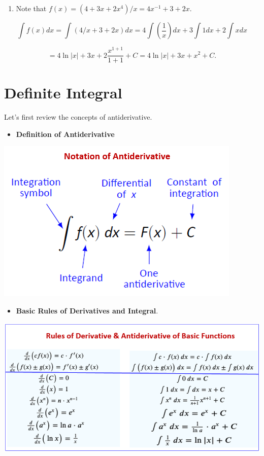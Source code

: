 \documentclass[
]{book}
\providecommand{\tightlist}{%
  \setlength{\itemsep}{0pt}\setlength{\parskip}{0pt}}
\begin{document}
\begin{enumerate}
\def\labelenumi{\arabic{enumi}.}
\setcounter{enumi}{1}
\tightlist
\item
  Note that \(f(x) = (4 + 3x + 2x^4)/x = 4x^{-1} + 3 + 2x\).
\end{enumerate}

\[
\int f(x) dx = \int (4/x + 3 + 2x) dx = 4\int \left( \frac{1}{x}\right)dx + 3\int 1 dx + 2\int x dx 
\]

\[
= 4\ln |x| + 3x +2\frac{x^{1+1}}{1+1}+C = 4\ln|x| + 3x + x^2 + C.
\]

\hypertarget{definite-integral}{%
\chapter{Definite Integral}\label{definite-integral}}

Let's first review the concepts of antiderivative.

\begin{itemize}
\tightlist
\item
  \textbf{Definition of Antiderivative}
\end{itemize}

\begin{center}\includegraphics[width=0.49\linewidth]{img12/w12-NotationAntiderivative} \end{center}

\begin{itemize}
\tightlist
\item
  \textbf{Basic Rules of Derivatives and Integral}.
\end{itemize}

\begin{center}\includegraphics[width=0.89\linewidth]{img12/w12-RulesBasicFunctions-Review} \end{center}
\end{document}
